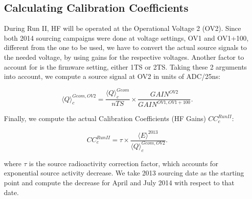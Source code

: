 \subsection{Calculating Calibration Coefficients}
During Run II, HF will be operated at the Operational Voltage 2 (OV2). Since
both 2014 sourcing campaigns were done at voltage settings, OV1 and OV1+100,
different from the one to be used, we have to convert the actual source signals to
the needed voltage, by using gains for the respective voltages. Another factor to
account for is the firmware setting, either 1TS or 2TS. Taking these 2 arguments
into account, we compute a source signal at OV2 in units of ADC/25\unit{ns}:
\begin{center}
	\begin{equation}
		\label{eq:Sig_OV2}
		{\langle{Q}\rangle}^{Geom,OV2}_{c} = \frac{{\langle{Q}\rangle}^{Geom}_{c}}{nTS} \times \frac{{GAIN}^{OV2}}{{GAIN}^{OV1,OV1+100}}.
	\end{equation}
\end{center}
Finally, we compute the actual Calibration Coefficients (HF Gains) ${CC}^{Run II}_{c}$:
\begin{center}
	\begin{equation}
		\label{eq:HF_Gains}
		{CC}^{Run II}_{c} = \tau \times \frac{{\langle{E}\rangle}^{2013}}{{\langle{Q}\rangle}^{Geom, OV2}_{c}}.
	\end{equation}
\end{center}
where $\tau$ is the source radioactivity correction factor, which accounts for exponential source activity decrease. We take 2013 sourcing date as the starting point and compute the decrease for April and July 2014 with respect to that date.

